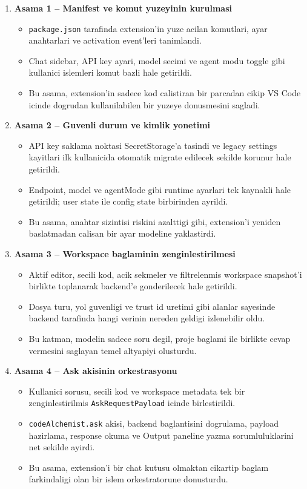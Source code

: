 \documentclass[11pt,a4paper]{article}
\begin{document}
\begin{enumerate}[leftmargin=1.5em]
\item \textbf{Asama 1 -- Manifest ve komut yuzeyinin kurulmasi}
\begin{itemize}[leftmargin=1.5em]
\item \texttt{package.json} tarafinda extension'in yuze acilan komutlari, ayar anahtarlari ve activation event'leri tanimlandi.
\item Chat sidebar, API key ayari, model secimi ve agent modu toggle gibi kullanici islemleri komut bazli hale getirildi.
\item Bu asama, extension'in sadece kod calistiran bir parcadan cikip VS Code icinde dogrudan kullanilabilen bir yuzeye donusmesini sagladi.
\end{itemize}

\item \textbf{Asama 2 -- Guvenli durum ve kimlik yonetimi}
\begin{itemize}[leftmargin=1.5em]
\item API key saklama noktasi SecretStorage'a tasindi ve legacy settings kayitlari ilk kullanicida otomatik migrate edilecek sekilde korunur hale getirildi.
\item Endpoint, model ve agentMode gibi runtime ayarlari tek kaynakli hale getirildi; user state ile config state birbirinden ayrildi.
\item Bu asama, anahtar sizintisi riskini azalttigi gibi, extension'i yeniden baslatmadan calisan bir ayar modeline yaklastirdi.
\end{itemize}

\item \textbf{Asama 3 -- Workspace baglaminin zenginlestirilmesi}
\begin{itemize}[leftmargin=1.5em]
\item Aktif editor, secili kod, acik sekmeler ve filtrelenmis workspace snapshot'i birlikte toplanarak backend'e gonderilecek hale getirildi.
\item Dosya turu, yol guvenligi ve trust id uretimi gibi alanlar sayesinde backend tarafinda hangi verinin nereden geldigi izlenebilir oldu.
\item Bu katman, modelin sadece soru degil, proje baglami ile birlikte cevap vermesini saglayan temel altyapiyi olusturdu.
\end{itemize}

\item \textbf{Asama 4 -- Ask akisinin orkestrasyonu}
\begin{itemize}[leftmargin=1.5em]
\item Kullanici sorusu, secili kod ve workspace metadata tek bir zenginlestirilmis \texttt{AskRequestPayload} icinde birlestirildi.
\item \texttt{codeAlchemist.ask} akisi, backend baglantisini dogrulama, payload hazirlama, response okuma ve Output paneline yazma sorumluluklarini net sekilde ayirdi.
\item Bu asama, extension'i bir chat kutusu olmaktan cikartip baglam farkindaligi olan bir islem orkestratorune donusturdu.
\end{itemize}


\end{enumerate}
\end{document}
